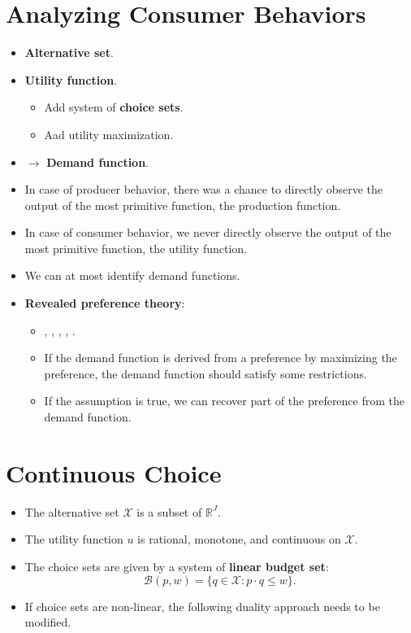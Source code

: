 \documentclass[]{book}
\providecommand{\tightlist}{%
  \setlength{\itemsep}{0pt}\setlength{\parskip}{0pt}}
\begin{document}
\section{Analyzing Consumer
Behaviors}\label{analyzing-consumer-behaviors}

\begin{itemize}
\item
  \textbf{Alternative set}.
\item
  \textbf{Utility function}.

  \begin{itemize}
  \tightlist
  \item
    Add system of \textbf{choice sets}.
  \item
    Aad utility maximization.
  \end{itemize}
\item
  \(\rightarrow\) \textbf{Demand function}.
\item
  In case of producer behavior, there was a chance to directly observe
  the output of the most primitive function, the production function.
\item
  In case of consumer behavior, we never directly observe the output of
  the most primitive function, the utility function.
\item
  We can at most identify demand functions.
\item
  \textbf{Revealed preference theory}:

  \begin{itemize}
  \tightlist
  \item
    \citet{Samuelson1938}, \citet{Houthakker1950}, \citet{Richter1966},
    \citet{Afriat1967}, \citet{Varian1982}.
  \item
    If the demand function is derived from a preference by maximizing
    the preference, the demand function should satisfy some
    restrictions.
  \item
    If the assumption is true, we can recover part of the preference
    from the demand function.
  \end{itemize}
\end{itemize}

\section{Continuous Choice}\label{continuous-choice}

\begin{itemize}
\tightlist
\item
  The alternative set \(\mathcal{X}\) is a subset of \(\mathbb{R}^J\).
\item
  The utility function \(u\) is rational, monotone, and continuous on
  \(\mathcal{X}\).
\item
  The choice sets are given by a system of \textbf{linear budget set}:
  \[
  \mathcal{B}(p, w) = \{q \in \mathcal{X}: p \cdot q \le w\}.
  \]
\item
  If choice sets are non-linear, the following duality approach needs to
  be modified.
\end{itemize}
\end{document}
